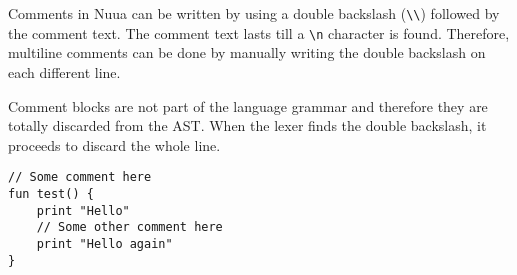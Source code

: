 Comments in Nuua can be written by using a double backslash (\texttt{\textbackslash\textbackslash}) followed by the comment text.
The comment text lasts till a \texttt{\textbackslash n} character is found. Therefore, multiline comments can be done
by manually writing the double backslash on each different line.

Comment blocks are not part of the language grammar and therefore they are totally discarded from the AST. When
the lexer finds the double backslash, it proceeds to discard the whole line.

\begin{verbatim}
// Some comment here
fun test() {
    print "Hello"
    // Some other comment here
    print "Hello again"
}
\end{verbatim}
